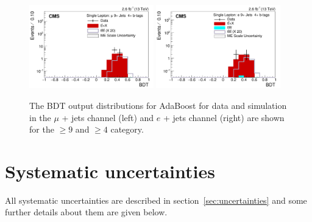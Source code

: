 \begin{figure}[ht!]
    \includegraphics[width=0.48\textwidth]{images/Run2/BDT_Mu29Aug400trees_5MinNodeSize_20nCuts_3MaxDepth_5adaboostbeta_adaBoost_alphaSTune_noMinEvents9nJets4nMtags_StackLogY.pdf}
    \includegraphics[width=0.48\textwidth]{images/Run2/BDT_El29Aug400trees_5MinNodeSize_20nCuts_3MaxDepth_5adaboostbeta_adaBoost_alphaSTune_noMinEvents9nJets4nMtags_StackLogY.pdf}    
    \caption{The BDT output distributions for AdaBoost for data and simulation in the $\mu$ + jets channel (left) and $e$ + jets channel (right) are shown for the $\geq9$ \njets and $\geq4$ \nMtags category.}
    \label{fig:BDT_Mu29Aug400trees_5MinNodeSize_20nCuts_3MaxDepth_5adaboostbeta_adaBoost_alphaSTune_noMinEvents94}
\end{figure}

\section{Systematic uncertainties}
\label{sec:uncertainties13}
All systematic uncertainties are described in section~\ref{sec:uncertainties} and some further details about them are given below.

